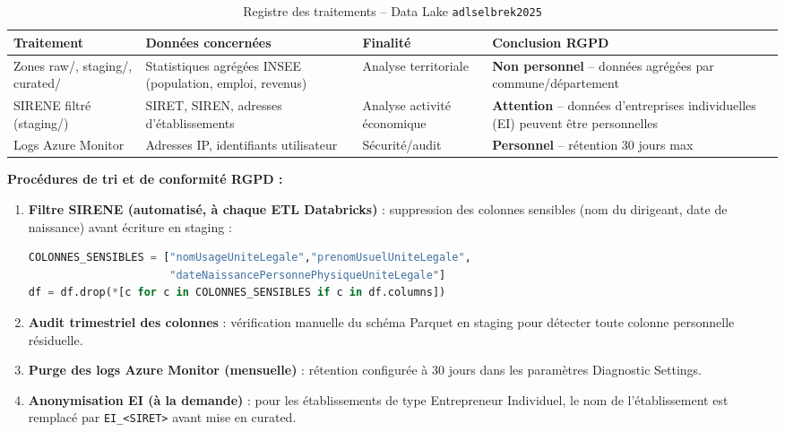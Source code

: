 \documentclass[12pt,a4paper]{article}
\begin{document}
\begin{table}[H]
\centering
\small
\begin{tabular}{L{3.5cm} L{4cm} L{2.5cm} L{3.5cm}}
  \toprule
  \textbf{Traitement} & \textbf{Données concernées} & \textbf{Finalité} & \textbf{Conclusion RGPD} \\
  \midrule
  Zones raw/, staging/, curated/ & Statistiques agrégées INSEE (population, emploi, revenus) & Analyse territoriale & \textbf{Non personnel} -- données agrégées par commune/département \\
  SIRENE filtré (staging/) & SIRET, SIREN, adresses d'établissements & Analyse activité économique & \textbf{Attention} -- données d'entreprises individuelles (EI) peuvent être personnelles \\
  Logs Azure Monitor & Adresses IP, identifiants utilisateur & Sécurité/audit & \textbf{Personnel} -- rétention 30 jours max \\
  \bottomrule
\end{tabular}
\caption{Registre des traitements -- Data Lake \texttt{adlselbrek2025}}
\end{table}

\textbf{Procédures de tri et de conformité RGPD :}

\begin{enumerate}
  \item \textbf{Filtre SIRENE (automatisé, à chaque ETL Databricks)} : suppression des colonnes sensibles (nom du dirigeant, date de naissance) avant écriture en staging :
\begin{lstlisting}[language=Python]
COLONNES_SENSIBLES = ["nomUsageUniteLegale","prenomUsuelUniteLegale",
                      "dateNaissancePersonnePhysiqueUniteLegale"]
df = df.drop(*[c for c in COLONNES_SENSIBLES if c in df.columns])
\end{lstlisting}
  \item \textbf{Audit trimestriel des colonnes} : vérification manuelle du schéma Parquet en staging pour détecter toute colonne personnelle résiduelle.
  \item \textbf{Purge des logs Azure Monitor (mensuelle)} : rétention configurée à 30 jours dans les paramètres Diagnostic Settings.
  \item \textbf{Anonymisation EI (à la demande)} : pour les établissements de type Entrepreneur Individuel, le nom de l'établissement est remplacé par \texttt{EI\_<SIRET>} avant mise en curated.
\end{enumerate}

\newpage
\end{document}
